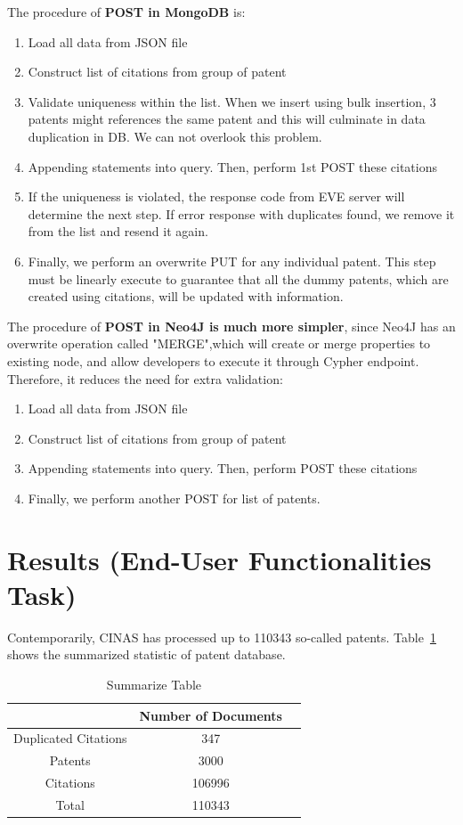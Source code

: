\documentclass{article}
\begin{document}
The procedure of \textbf{POST in MongoDB} is:
\begin{enumerate}
 \item Load all data from JSON file
 \item Construct list of citations from group of patent
 \item Validate uniqueness within the list. When we insert using bulk insertion, 3 patents might references the same patent and this will culminate in data duplication in DB. We can not overlook this problem.
 \item Appending statements into query. Then, perform 1st POST these citations 
 \item If the uniqueness is violated, the response code from EVE server will determine the next step. If error response with duplicates found, we remove it from the list and resend it again.
 \item Finally, we perform an overwrite PUT for any individual patent. This step must be linearly execute to guarantee that all the dummy patents, which are created using citations, will be updated with information.
\end{enumerate}

The procedure of \textbf{POST in Neo4J is much more simpler}, since Neo4J has an overwrite operation called "MERGE",which will create or merge properties to existing node, and allow developers to execute it through Cypher endpoint. Therefore, it reduces the need for extra validation:
\begin{enumerate}
 \item Load all data from JSON file
 \item Construct list of citations from group of patent
 \item Appending statements into query. Then, perform POST these citations 
 \item Finally, we perform another POST for list of patents.
\end{enumerate}


\section{Results (End-User Functionalities Task)}
Contemporarily, CINAS has processed up to 110343 so-called patents. Table~\ref{table:summarize} shows the summarized statistic of patent database.
\begin{table}[!h]
\begin{center}
\begin{tabular}{|c|c|l|} \hline
 &Number of Documents\\ \hline
 Duplicated Citations&347 \\ \hline
Patents&3000 \\ \hline
Citations&106996 \\ \hline
Total & 110343\\ \hline
\end{tabular}
\end{center}
\caption{Summarize Table} \label{table:summarize}
\end{table}
\end{document}
